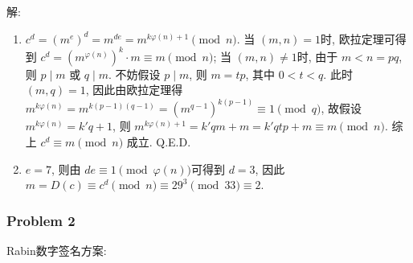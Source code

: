 \documentclass[a4paper,12pt]{ctexart}
\begin{document}
      解:\begin{enumerate}
          \item $ c^d=(m^e)^d=m^{de}=m^{k\varphi(n)+1}\pmod{n} $. 当 $ (m,n)=1 $时, 欧拉定理可得到 
          $ c^d=(m^{\varphi(n)})^k\cdot m\equiv m\pmod{n} $; 当 $ (m,n)\ne 1 $时, 由于 $ m<n=pq $, 则 $ p\mid m $ 或 $ q\mid m $. 不妨假设 $ p\mid m $, 则 $ m=tp $, 其中 $ 0<t<q $. 此时 $ (m,q)=1 $, 因此由欧拉定理得
          $ m^{k\varphi(n)}=m^{k(p-1)(q-1)}=(m^{q-1})^{k(p-1)}\equiv 1\pmod{q} $, 故假设 $ m^{k\varphi(n)}=k'q+1 $, 则 $ m^{k\varphi(n)+1}=k'qm+m=k'qtp+m\equiv m\pmod{n} $. 综上 $ c^d\equiv m\pmod{n} $ 成立. Q.E.D.
          \item $ e=7 $, 则由 $ de\equiv 1\pmod{\varphi(n)} $可得到 $ d=3 $, 因此 $ m=D(c)\equiv c^d\pmod{n}\equiv 29^3\pmod{33}\equiv 2 $.
      \end{enumerate}
\subsubsection*{Problem 2}
    Rabin数字签名方案: 
    
\end{document}
